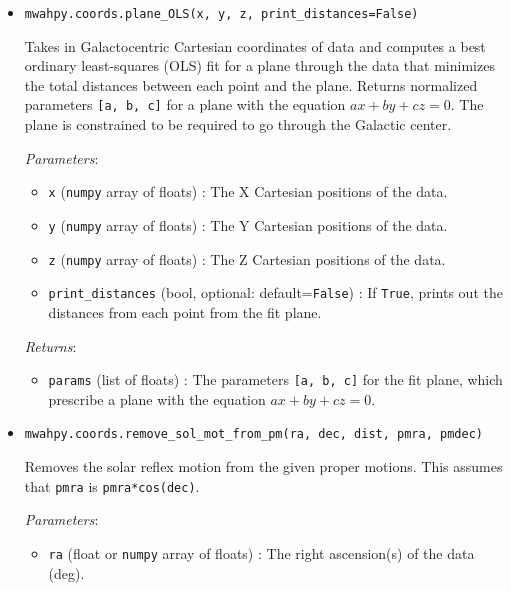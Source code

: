 \documentclass{article}
\begin{document}
\begin{itemize}
\item \verb!mwahpy.coords.plane_OLS(x, y, z, print_distances=False)!

Takes in Galactocentric Cartesian coordinates of data and computes a best ordinary least-squares (OLS) fit for a plane through the data that minimizes the total distances between each point and the plane. Returns normalized parameters \verb![a, b, c]! for a plane with the equation $ax + by + cz = 0$. The plane is constrained to be required to go through the Galactic center.

\textit{Parameters}: \begin{itemize}

\item \verb!x! (\verb!numpy! array of floats) : The X Cartesian positions of the data.

\item \verb!y! (\verb!numpy! array of floats) : The Y Cartesian positions of the data.

\item \verb!z! (\verb!numpy! array of floats) : The Z Cartesian positions of the data.

\item \verb!print_distances! (bool, optional: default=\verb!False!) : If \verb!True!, prints out the distances from each point from the fit plane. 

\end{itemize}

\textit{Returns}: \begin{itemize}

\item \verb!params! (list of floats) : The parameters \verb![a, b, c]! for the fit plane, which prescribe a plane with the equation $ax + by + cz = 0$. 

\end{itemize}



\item \verb!mwahpy.coords.remove_sol_mot_from_pm(ra, dec, dist, pmra, pmdec)!

Removes the solar reflex motion from the given proper motions. This assumes that \verb!pmra! is \verb!pmra*cos(dec)!.

\textit{Parameters}: \begin{itemize}

\item \verb!ra! (float or \verb!numpy! array of floats) : The right ascension(s) of the data (deg).


\end{itemize}
\end{itemize}
\end{document}
